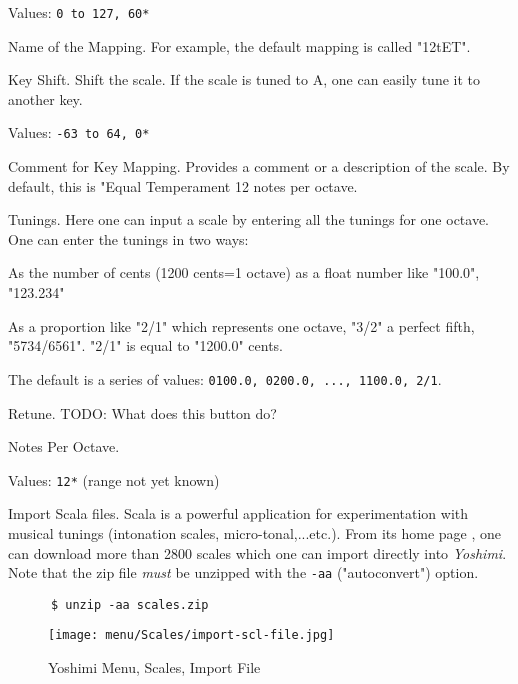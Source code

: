    Values: \texttt{0 to 127, 60*}

   Name of the Mapping.
   For example, the default mapping is called "12tET".

   Key Shift.
   Shift the scale. If the scale is tuned to A, one can easily tune it to
   another key.

   Values: \texttt{-63 to 64, 0*}

   Comment for Key Mapping.
   Provides a comment or a description of the scale.
   By default, this is "Equal Temperament 12 notes per octave.

   Tunings.
   Here one can input a scale by entering all the tunings for one octave. 
   One can enter the tunings in two ways: 

   \begin{enumber}
      \item As the number of cents (1200 cents=1 octave) as a float number
      like "100.0", "123.234"
      \item As a proportion like "2/1" which represents one octave, "3/2" a
      perfect fifth, "5734/6561".  "2/1" is equal to "1200.0" cents.
   \end{enumber}

   The default is a series of values:
   \texttt{0100.0, 0200.0, ..., 1100.0, 2/1}.

   Retune.
   TODO:  What does this button do?

   Notes Per Octave.

   Values: \texttt{12*} (range not yet known)

   Import Scala files.
   Scala is a powerful application for experimentation with musical tunings
   (intonation scales, micro-tonal,...etc.). From its home page \cite{scala},
   one can download more than 2800 scales which one can import directly into
   \textsl{Yoshimi}.  Note that the zip file \textsl{must} be unzipped with
   the \texttt{-aa} ("autoconvert") option.

    \begin{verbatim}
      $ unzip -aa scales.zip
    \end{verbatim}

\begin{figure}[H]
   \centering 
   \texttt{[image: menu/Scales/import-scl-file.jpg]}
   \caption{Yoshimi Menu, Scales, Import File}
   \label{fig:yoshimi_menu_scales_import_file}
\end{figure}

